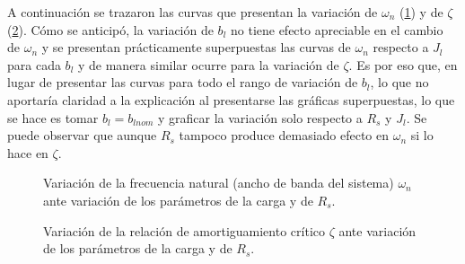 \documentclass[a4paper, 10pt, onecolumn,journal]{ieeeconf}
\begin{document}
A continuación se trazaron las curvas que presentan la variación
de $\omega_n$ (\cref{variacion de omega_n}) y de $\zeta$ (\cref{variacion de zita}). Cómo se anticipó,
la variación de $b_l$ no tiene efecto apreciable en el cambio de $\omega_n$ y se presentan prácticamente superpuestas
las curvas de $\omega_n$ respecto a $J_l$ para cada $b_l$ y de manera similar ocurre para la variación de $\zeta$.
Es por eso que, en lugar de presentar las curvas para todo el rango de variación de $b_l$, lo que no aportaría claridad
a la explicación al presentarse las gráficas superpuestas, lo que se hace es tomar $b_l = b_{lnom}$ y graficar la variación
solo respecto a $R_s$ y $J_l$. Se puede observar que aunque $R_s$ tampoco produce demasiado efecto en $\omega_n$ si lo hace en $\zeta$.

\begin{figure}[thpb]
	\centering
	\begin{adjustbox}{max width=\columnwidth}
	\end{adjustbox}
	\caption{Variación de la frecuencia natural (ancho de banda del sistema) $\omega_n$ ante variación de los parámetros de la carga y de $R_s$.}
	\label{variacion de omega_n}
\end{figure}

\begin{figure}[thpb]
	\centering
	\begin{adjustbox}{max width=\columnwidth}
	\end{adjustbox}
	\caption{Variación de la relación de amortiguamiento crítico $\zeta$ ante variación de los parámetros de la carga y de $R_s$.}
	\label{variacion de zita}
\end{figure}
\end{document}
